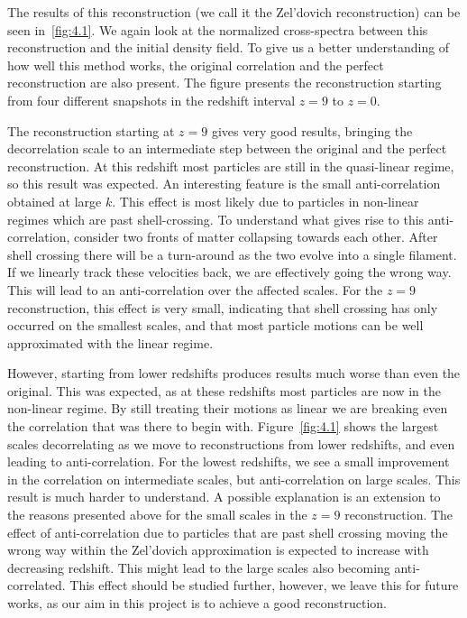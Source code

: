 The results of this reconstruction (we call it the Zel'dovich reconstruction) can be seen in~\ref{fig:4.1}. We again look at the normalized cross-spectra between this reconstruction and the initial density field. To give us a better understanding of how well this method works, the original correlation and the perfect reconstruction are also present. The figure presents the reconstruction starting from four different snapshots in the redshift interval $z=9$ to $z=0$.

The reconstruction starting at $z=9$ gives very good results, bringing the decorrelation scale to an intermediate step between the original and the perfect reconstruction. At this redshift most particles are still in the quasi-linear regime, so this result was expected. An interesting feature is the small anti-correlation obtained at large $k$. This effect is most likely due to particles in non-linear regimes which are past shell-crossing. To understand what gives rise to this anti-correlation, consider two fronts of matter collapsing towards each other. After shell crossing  there will be a turn-around as the two evolve into a single filament. If we linearly track these velocities back, we are effectively going the wrong way. This will lead to an anti-correlation over the affected scales. For the $z=9$ reconstruction, this effect is very small, indicating that shell crossing has only occurred on the smallest scales, and that most particle motions can be well approximated with the linear regime. 

However, starting from lower redshifts produces results much worse than even the original. This was expected, as at these redshifts most particles are now in the non-linear regime. By still treating their motions as linear we are breaking even the correlation that was there to begin with. Figure~\ref{fig:4.1} shows the largest scales decorrelating as we move to reconstructions from lower redshifts, and even leading to anti-correlation. For the lowest redshifts, we see a small improvement in the correlation on intermediate scales, but anti-correlation on large scales. This result is much harder to understand. A possible explanation is an extension to the reasons presented above for the small scales in the $z=9$ reconstruction. The effect of anti-correlation due to particles that are past shell crossing moving the wrong way within the Zel'dovich approximation is expected to increase with decreasing redshift. This might lead to the large scales also becoming anti-correlated. This effect should be studied further, however, we leave this for future works, as our aim in this project is to achieve a good reconstruction.

